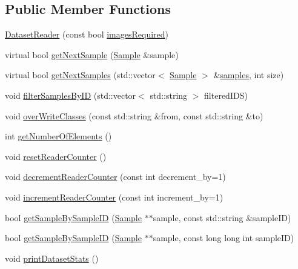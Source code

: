 \subsection*{Public Member Functions}
\begin{DoxyCompactItemize}
\item 
\hyperlink{class_dataset_reader_a357a86043c584062497bbc0fcd3ea420}{Dataset\+Reader} (const bool \hyperlink{class_dataset_reader_a71d04d25d58e0e9a0c05d69afcff03a1}{images\+Required})
\item 
virtual bool \hyperlink{class_dataset_reader_af50668f52c34f4620c44e91f26dd11ce}{get\+Next\+Sample} (\hyperlink{struct_sample}{Sample} \&sample)
\item 
virtual bool \hyperlink{class_dataset_reader_a4875a59f33227329ca93241add8370c0}{get\+Next\+Samples} (std\+::vector$<$ \hyperlink{struct_sample}{Sample} $>$ \&\hyperlink{class_dataset_reader_adeafe74d71d96205e2920f76d3fc6a72}{samples}, int size)
\item 
void \hyperlink{class_dataset_reader_a17085ffacc392c459a95cd510f341a7d}{filter\+Samples\+By\+ID} (std\+::vector$<$ std\+::string $>$ filtered\+I\+DS)
\item 
void \hyperlink{class_dataset_reader_ac662ff47f081f872d05ade9a33724a2a}{over\+Write\+Classes} (const std\+::string \&from, const std\+::string \&to)
\item 
int \hyperlink{class_dataset_reader_a67f4c1c3fdfcc0c6bf3b90d65d5fc7c5}{get\+Number\+Of\+Elements} ()
\item 
void \hyperlink{class_dataset_reader_a528f4df5009c93efd37ff5cfafe4c778}{reset\+Reader\+Counter} ()
\item 
void \hyperlink{class_dataset_reader_ac94f1934639708dc2a29b1ba05e3cc0b}{decrement\+Reader\+Counter} (const int decrement\+\_\+by=1)
\item 
void \hyperlink{class_dataset_reader_a951146f7949deff5e17c3482f4339672}{increment\+Reader\+Counter} (const int increment\+\_\+by=1)
\item 
bool \hyperlink{class_dataset_reader_aeff3413e85bbde9f1f755e36860c7f3a}{get\+Sample\+By\+Sample\+ID} (\hyperlink{struct_sample}{Sample} $\ast$$\ast$sample, const std\+::string \&sample\+ID)
\item 
bool \hyperlink{class_dataset_reader_a2cfa8b90e643a325b519a292c62d4460}{get\+Sample\+By\+Sample\+ID} (\hyperlink{struct_sample}{Sample} $\ast$$\ast$sample, const long long int sample\+ID)
\item 
void \hyperlink{class_dataset_reader_a1e37cddfc448b548dc6ca40f629884cb}{print\+Dataset\+Stats} ()

\end{DoxyCompactItemize}
